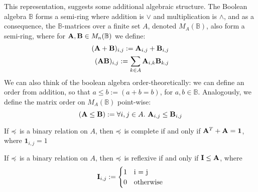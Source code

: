 \documentclass{article}
\begin{document}
	This representation, suggests some additional algebraic structure. The Boolean algebra $\mathbb B$ forms a semi-ring where addition is $\lor$ and multiplication is $\land$, and as a consequence, the $\mathbb B$-matrices over a finite set $A$, denoted $M_A(\mathbb B)$, also form a semi-ring, where for $\mathbf A, \mathbf B \in M_n(\mathbb B)$ we define:
	\begin{align*}
		(\mathbf A + \mathbf B)_{i,j} := \mathbf A_{i,j} + \mathbf B_{i,j} \\
		(\mathbf A \mathbf B)_{i,j} := \sum_{k \in A} \mathbf A_{i,k} \mathbf B_{k,j} 
	\end{align*}
	We can also think of the boolean algebra order-theoretically: we can define an order from addition, so that $a \leq b := (a + b = b)$, for $a, b \in \mathbb B$. Analogously, we define the matrix order on $M_A(\mathbb B)$ point-wise:
	\begin{equation*}
		(\mathbf A \leq \mathbf B) := \forall i,j \in A. ~ \mathbf A_{i,j} \leq \mathbf B_{i,j}
	\end{equation*}
	
	\begin{fact}
		If $\preccurlyeq$ is a binary relation on $A$, then $\preccurlyeq$ is complete if and only if $\mathbf A^T + \mathbf A = \mathbf 1$, where $\mathbf{1}_{i,j} = 1$
	\end{fact}

	\begin{fact}
		If $\preccurlyeq$ is a binary relation on $A$, then $\preccurlyeq$ is reflexive if and only if $\mathbf I \leq \mathbf A$, where 
		\[ \mathbf I_{i,j} := \begin{cases} 1 & \text{i = j}\\ 0 &\text{otherwise} \end{cases} \]
	\end{fact}
	
\end{document}
